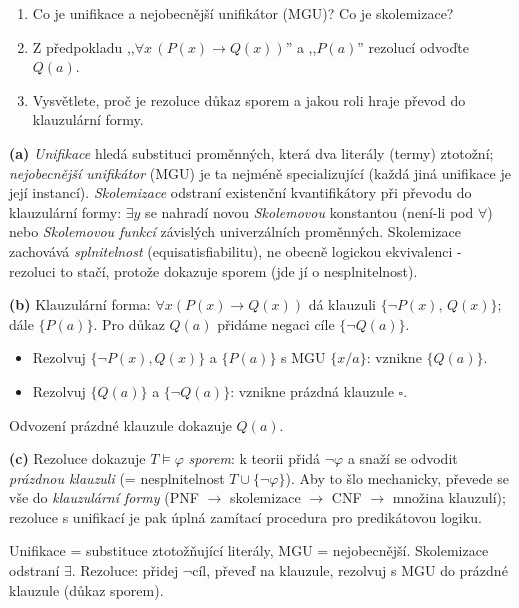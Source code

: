 \begin{zadani}
\begin{enumerate}[label=(\alph*)]
  \item {} Co je unifikace a nejobecnější unifikátor (MGU)? Co je skolemizace?
  \item {} Z předpokladu ,,$\forall x\,(P(x)\to Q(x))$'' a ,,$P(a)$'' rezolucí odvoďte $Q(a)$.
  \item {} Vysvětlete, proč je rezoluce důkaz sporem a jakou roli hraje převod do klauzulární formy.
\end{enumerate}
\end{zadani}

\begin{reseni}
\textbf{(a)} \emph{Unifikace} hledá substituci proměnných, která dva literály (termy) ztotožní; \emph{nejobecnější unifikátor} (MGU) je ta nejméně specializující (každá jiná unifikace je její instancí). \emph{Skolemizace} odstraní existenční kvantifikátory při převodu do klauzulární formy: $\exists y$ se nahradí novou \emph{Skolemovou} konstantou (není-li pod $\forall$) nebo \emph{Skolemovou funkcí} závislých univerzálních proměnných. Skolemizace zachovává \emph{splnitelnost} (equisatisfiabilitu), ne obecně logickou ekvivalenci - rezoluci to stačí, protože dokazuje sporem (jde jí o nesplnitelnost).

\textbf{(b)} Klauzulární forma: $\forall x(P(x)\to Q(x))$ dá klauzuli $\{\neg P(x),\,Q(x)\}$; dále $\{P(a)\}$. Pro důkaz $Q(a)$ přidáme negaci cíle $\{\neg Q(a)\}$.
\begin{itemize}\setlength\itemsep{1pt}
  \item Rezolvuj $\{\neg P(x),Q(x)\}$ a $\{P(a)\}$ s MGU $\{x/a\}$: vznikne $\{Q(a)\}$.
  \item Rezolvuj $\{Q(a)\}$ a $\{\neg Q(a)\}$: vznikne prázdná klauzule $\square$.
\end{itemize}
Odvození prázdné klauzule dokazuje $Q(a)$.

\textbf{(c)} Rezoluce dokazuje $T\models\varphi$ \emph{sporem}: k teorii přidá $\neg\varphi$ a snaží se odvodit \emph{prázdnou klauzuli} (= nesplnitelnost $T\cup\{\neg\varphi\}$). Aby to šlo mechanicky, převede se vše do \emph{klauzulární formy} (PNF $\to$ skolemizace $\to$ CNF $\to$ množina klauzulí); rezoluce s unifikací je pak úplná zamítací procedura pro predikátovou logiku.
\end{reseni}

\begin{jadro}
Unifikace = substituce ztotožňující literály, MGU = nejobecnější. Skolemizace odstraní $\exists$. Rezoluce: přidej $\neg$cíl, převeď na klauzule, rezolvuj s MGU do prázdné klauzule (důkaz sporem).
\end{jadro}

